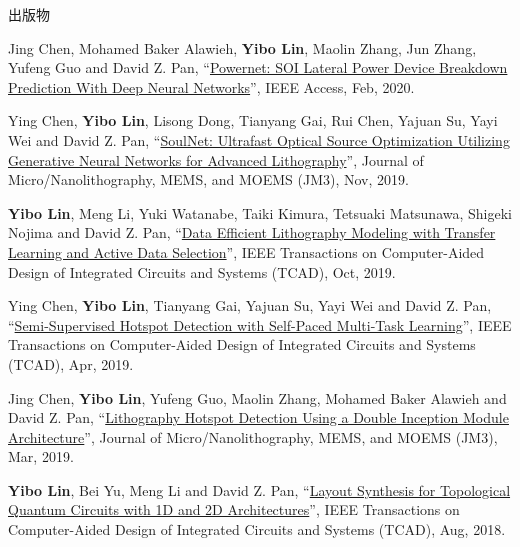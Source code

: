 \begin{rSection}{出版物}
\begin{description}[font=\normalfont, rightmargin=2em]
{}
            

\item[{[J17]}]{
        Jing Chen, Mohamed Baker Alawieh, \textbf{Yibo Lin}, Maolin Zhang, Jun Zhang, Yufeng Guo and David Z. Pan, 
    ``\href{https://doi.org/10.1109/ACCESS.2020.2970966}{Powernet: SOI Lateral Power Device Breakdown Prediction With Deep Neural Networks}'', 
    IEEE Access, Feb, 2020.
    
}
            

\item[{[J16]}]{
        Ying Chen, \textbf{Yibo Lin}, Lisong Dong, Tianyang Gai, Rui Chen, Yajuan Su, Yayi Wei and David Z. Pan, 
    ``\href{https://dx.doi.org/10.1117/1.JMM.18.4.043506}{SoulNet: Ultrafast Optical Source Optimization Utilizing Generative Neural Networks for Advanced Lithography}'', 
    Journal of Micro/Nanolithography, MEMS, and MOEMS (JM3), Nov, 2019.
    
}
            

\item[{[J15]}]{
        \textbf{Yibo Lin}, Meng Li, Yuki Watanabe, Taiki Kimura, Tetsuaki Matsunawa, Shigeki Nojima and David Z. Pan, 
    ``\href{https://doi.org/10.1109/TCAD.2018.2864251}{Data Efficient Lithography Modeling with Transfer Learning and Active Data Selection}'', 
    IEEE Transactions on Computer-Aided Design of Integrated Circuits and Systems (TCAD), Oct, 2019.
    
}
            

\item[{[J14]}]{
        Ying Chen, \textbf{Yibo Lin}, Tianyang Gai, Yajuan Su, Yayi Wei and David Z. Pan, 
    ``\href{https://doi.org/10.1109/TCAD.2019.2912948}{Semi-Supervised Hotspot Detection with Self-Paced Multi-Task Learning}'', 
    IEEE Transactions on Computer-Aided Design of Integrated Circuits and Systems (TCAD), Apr, 2019.
    
}
            

\item[{[J13]}]{
        Jing Chen, \textbf{Yibo Lin}, Yufeng Guo, Maolin Zhang, Mohamed Baker Alawieh and David Z. Pan, 
    ``\href{https://doi.org/10.1117/1.JMM.18.1.013507}{Lithography Hotspot Detection Using a Double Inception Module Architecture}'', 
    Journal of Micro/Nanolithography, MEMS, and MOEMS (JM3), Mar, 2019.
    
}
            

\item[{[J12]}]{
        \textbf{Yibo Lin}, Bei Yu, Meng Li and David Z. Pan, 
    ``\href{https://doi.org/10.1109/TCAD.2017.2760511}{Layout Synthesis for Topological Quantum Circuits with 1D and 2D Architectures}'', 
    IEEE Transactions on Computer-Aided Design of Integrated Circuits and Systems (TCAD), Aug, 2018.
    
}
\end{description}
\end{rSection}
